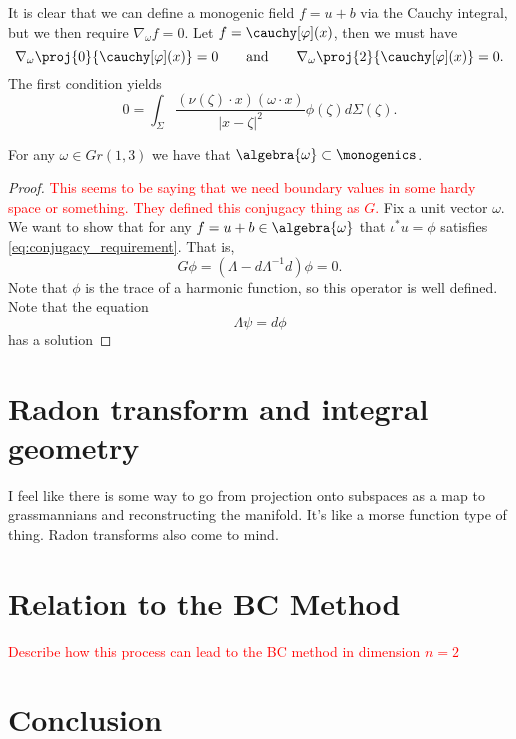 
It is clear that we can define a monogenic field $f=u+b$ via the Cauchy integral, but we then require $\nabla_\omega f = 0$.  Let $f=\cauchy[\varphi](x)$, then we must have
\[
\nabla_\omega \proj{0}{\cauchy[\varphi](x)} = 0 \qquad \textrm{and} \qquad \nabla_\omega \proj{2}{\cauchy[\varphi](x)}=0.
\]
The first condition yields
\[
0 = \int_\Sigma \frac{(\nu(\zeta)\cdot x) (\omega \cdot x)}{|x-\zeta|^2} \phi(\zeta) d\Sigma(\zeta).
\]


\begin{theorem}
    For any $\omega \in Gr(1,3)$ we have that $\algebra{\omega}\subset \monogenics$. 
\end{theorem}
\begin{proof}
    \textcolor{red}{This seems to be saying that we need boundary values in some hardy space or something. They defined this conjugacy thing as $G$.}
    Fix a unit vector $\omega$.  We want to show that for any $f=u+b\in \algebra{\omega}$ that $\iota^* u=\phi$ satisfies \ref{eq:conjugacy_requirement}.  That is,
    \[
        G\phi = (\Lambda - d\Lambda^{-1}d) \phi = 0.
    \]
    Note that $\phi$ is the trace of a harmonic function, so this operator is well defined.  Note that the equation
    \[
        \Lambda \psi = d \phi
    \]
    has a solution
\end{proof}

\section{Radon transform and integral geometry}

I feel like there is some way to go from projection onto subspaces as a map to grassmannians and reconstructing the manifold.  It's like a morse function type of thing.  Radon transforms also come to mind.

\section{Relation to the BC Method}

\textcolor{red}{Describe how this process can lead to the BC method in dimension $n=2$}


\section{Conclusion}


